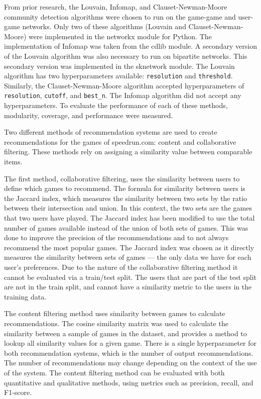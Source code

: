 From prior research, the Louvain, Infomap, and Clauset-Newman-Moore community detection algorithms were chosen to run on the game-game and user-game networks. Only two of these algorithms (Louvain and Clauset-Newman-Moore) were implemented in the networkx module for Python. The implementation of Infomap was taken from the cdlib module. A secondary version of the Louvain algorithm was also necessary to run on bipartite networks. This secondary version was implemented in the sknetwork module. The Louvain algorithm has two hyperparameters available: \texttt{resolution} and \texttt{threshold}. Similarly, the Clauset-Newman-Moore algorithm accepted hyperparameters of \texttt{resolution}, \texttt{cutoff}, and \texttt{best\_n}. The Infomap algorithm did not accept any hyperparameters. To evaluate the performance of each of these methods, modularity, coverage, and performance were measured.


Two different methods of recommendation systems are used to create recommendations for the games of speedrun.com: content and collaborative filtering. These methods rely on assigning a similarity value between comparable items. 


The first method, collaborative filtering, uses the similarity between users to define which games to recommend. The formula for similarity between users is the Jaccard index, which measures the similarity between two sets by the ratio between their intersection and union. In this context, the two sets are the games that two users have played. The Jaccard index has been modified to use the total number of games available instead of the union of both sets of games. This was done to improve the precision of the recommendations and to not always recommend the most popular games. The Jaccard index was chosen as it directly measures the similarity between sets of games — the only data we have for each user's preferences. Due to the nature of the collaborative filtering method it cannot be evaluated via a train/test split. The users that are part of the test split are not in the train split, and cannot have a similarity metric to the users in the training data.


The content filtering method uses similarity between games to calculate recommendations. The cosine similarity matrix was used to calculate the similarity between a sample of games in the dataset, and provides a method to lookup all similarity values for a given game. There is a single hyperparameter for both recommendation systems, which is the number of output recommendations. The number of recommendations may change depending on the context of the use of the system. The content filtering method can be evaluated with both quantitative and qualitative methods, using metrics such as precision, recall, and F1-score. 
